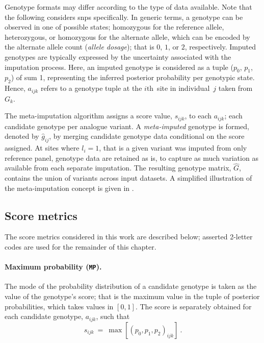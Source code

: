 Genotype formats may differ according to the type of data available.
Note that the following considers \glspl{snp} specifically.
In generic terms, a genotype can be observed in one of  possible states; homozygous for the reference allele, heterozygous, or homozygous for the alternate allele, which can be encoded by the alternate allele count (\emph{allele dosage}); that is $0$, $1$, or $2$, respectively.
Imputed genotypes are typically expressed by the uncertainty associated with the imputation process.
Here, an imputed genotype is considered as a tuple (${p_{0}}$, ${p_{1}}$, ${p_{2}}$) of sum 1, representing the inferred posterior probability per genotypic state.
Hence, $a_{ijk}$ refers to a genotype tuple at the $i\text{th}$~site in individual~$j$ taken from $G_{k}$.

The meta-imputation algorithm assigns a score value, $s_{ijk}$, to each $a_{ijk}$; \ie each candidate genotype per analogue variant.
A \emph{meta-imputed} genotype is formed, denoted by $\hat{g}_{ij}$, by merging candidate genotype data conditional on the score assigned.
At sites where ${l_{i}=1}$, that is a given variant was imputed from only  reference panel, genotype data are retained as is, to capture as much variation as available from each separate imputation.
The resulting genotype matrix, $\hat{G}$, contains the union of variants across input datasets.
A simplified illustration of the meta-imputation concept is given in .



%
\subsection{Score metrics}
\label{metaimpute_score}
%

The score metrics considered in this work are described below; asserted 2-letter codes are used for the remainder of this chapter.

\paragraph{Maximum probability (\texttt{MP}).}
The mode of the probability distribution of a candidate genotype is taken as the value of the genotype's score; that is the maximum value in the tuple of posterior probabilities, which takes values in ${[0,1]}$.
The score is separately obtained for each candidate genotype, $a_{ijk}$, such that
\begin{equation}
	s_{ijk} ~=~ \max\left[(p_0,p_1,p_2)_{ijk}\right]\ .
\end{equation}

